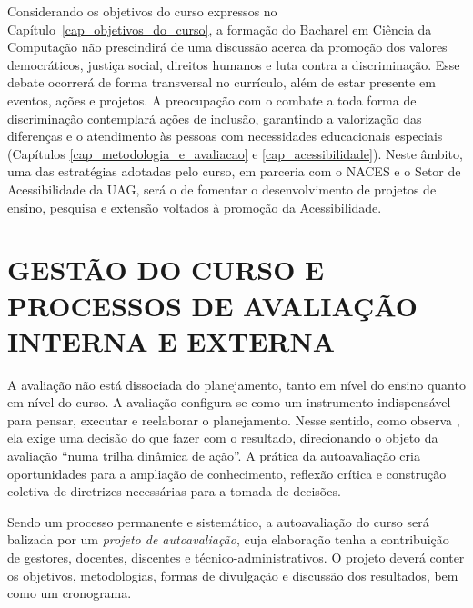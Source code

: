 \documentclass[
	12pt,				%
	openright,			%
  oneside,     %
	a4paper,			%
	chapter=TITLE,		%
	english,			%
	french,				%
	spanish,			%
	brazil				%
	]{abntex2}
\begin{document}
Considerando os objetivos do curso expressos no Capítulo~\ref{cap_objetivos_do_curso}, a formação do Bacharel em Ciência da Computação não prescindirá de uma discussão acerca da promoção dos valores democráticos, justiça social, direitos humanos e luta contra a discriminação. Esse debate ocorrerá de forma transversal no currículo, além de estar presente em eventos, ações e projetos. A preocupação com o combate a toda forma de discriminação contemplará ações de inclusão, garantindo a valorização das diferenças e o atendimento às pessoas com necessidades educacionais especiais (Capítulos \ref{cap_metodologia_e_avaliacao} e \ref{cap_acessibilidade}). Neste âmbito, uma das estratégias adotadas pelo curso, em parceria com o NACES e o Setor de Acessibilidade da UAG, será o de fomentar o desenvolvimento de projetos de ensino, pesquisa e extensão voltados à promoção da Acessibilidade.






%
%






\chapter{GESTÃO DO CURSO E PROCESSOS DE AVALIAÇÃO INTERNA E EXTERNA}
\label{cap_gestao_do_curso_e_processos_de_avaliacao_interna_e_externa}

A avaliação não está dissociada do planejamento, tanto em nível do ensino quanto em nível do curso. A avaliação configura-se como um instrumento indispensável para pensar, executar e reelaborar o planejamento. Nesse sentido, como observa , ela exige uma decisão do que fazer com o resultado, direcionando o objeto da avaliação “numa trilha dinâmica de ação”. A prática da autoavaliação cria oportunidades para a ampliação de conhecimento, reflexão crítica e construção coletiva de diretrizes necessárias para a tomada de decisões.

Sendo um processo permanente e sistemático, a autoavaliação do curso será balizada por um \textit{projeto de autoavaliação}, cuja elaboração tenha a contribuição de gestores, docentes, discentes e técnico-administrativos. O projeto deverá conter os objetivos, metodologias, formas de divulgação e discussão dos resultados, bem como um cronograma.
\end{document}
